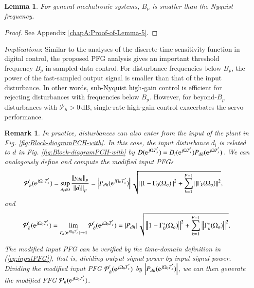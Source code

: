 \documentclass [11pt, proquest] {uwthesis}[2020/02/24]
\newtheorem{lemma}{Lemma}
\newtheorem{remark}{Remark}
\begin{document}
\begin{lemma}\label{For-general-mechatronic}For general mechatronic
systems, $B_{p}$ is smaller than the Nyquist frequency.\end{lemma} 
\begin{proof}
See Appendix \ref{chapA:Proof-of-Lemma-5}.
\end{proof}
\emph{Implications}: Similar to the analyses of the discrete-time
sensitivity function in digital control, the proposed PFG analysis
gives an important threshold frequency $B_{p}$ in sampled-data control.
For disturbance frequencies below $B_{p}$, the power of the fast-sampled
output signal is smaller than that of the input disturbance. In other
words, sub-Nyquist high-gain control is efficient for rejecting disturbances
with frequencies below $B_{p}$. However, for beyond-$B_{p}$ disturbances
with $\mathcal{P}_{h}>0\,\text{dB}$, single-rate high-gain control
exacerbates the servo performance. 

\begin{remark}\label{In-practice,-disturbances}In practice, disturbances
can also enter from the input of the plant in Fig. \ref{fig:Block-diagramPCH-with}.
In this case, the input disturbance $d_{i}$ is related to $d$ in
Fig. \ref{fig:Block-diagramPCH-with} by $D(\mathrm{e}^{j\Omega T_{s}^{'}})=D_{i}(\mathrm{e}^{j\Omega T_{s}^{'}})P_{dh}(\mathrm{e}^{j\Omega T_{s}^{'}})$.
We can analogously define and compute the modified input PFGs
\begin{align}
\mathcal{P}_{b}^{'}(\mathrm{e}^{j\Omega_{0}T_{s}^{'}}) & =\sup_{d_{i}\neq0}\frac{\left\Vert y_{dh}\right\Vert _{p}}{\left\Vert d_{i}\right\Vert _{p}}=\left|P_{dh}(\mathrm{e}^{j\Omega_{0}T_{s}^{'}})\right|\sqrt{\left\Vert 1-\Gamma_{0}(\Omega_{o})\right\Vert ^{2}+\sum_{k=1}^{F-1}\left\Vert \Gamma_{k}(\Omega_{o})\right\Vert ^{2}},\label{eq:inputPFG}
\end{align}
and
\begin{align}
\mathcal{P}_{h}^{'}(\mathrm{e}^{j\Omega_{0}T_{s}^{'}})=\lim_{T_{d}(\mathrm{e}^{j\Omega_{0}T_{s}^{'}})\rightarrow1}\mathcal{P}_{b}^{'}(\mathrm{e}^{j\Omega_{0}T_{s}^{'}})=\left|P_{dh}\right|\sqrt{\left\Vert 1-\Gamma_{0}^{*}(\Omega_{o})\right\Vert ^{2}+\sum_{k=1}^{F-1}\left\Vert \Gamma_{k}^{*}(\Omega_{o})\right\Vert ^{2}}.\label{eq:PFR DOB-1-1}
\end{align}

The modified input PFG can be verified by the time-domain definition
in (\ref{eq:inputPFG}), that is, dividing output signal power by
input signal power. Dividing the modified input PFG $\mathcal{P}_{h}^{'}(\mathrm{e}^{j\Omega_{0}T_{s}^{'}})$
by $\left|P_{dh}(\mathrm{e}^{j\Omega_{0}T_{s}^{'}})\right|$, we can then
generate the modified PFG $\mathcal{P}_{h}(\mathrm{e}^{j\Omega_{0}T_{s}^{'}})$.
\end{remark}
\end{document}
